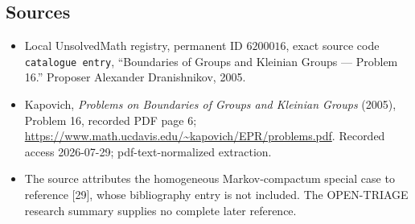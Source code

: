 \documentclass[11pt]{article}
\begin{document}
\subsection{Sources}
\begin{itemize}
\item Local UnsolvedMath registry, permanent ID \(6200016\), exact source code \texttt{catalogue entry}, ``Boundaries of Groups and Kleinian Groups --- Problem 16.'' Proposer Alexander Dranishnikov, 2005.
\item Kapovich, \emph{Problems on Boundaries of Groups and Kleinian Groups} (2005), Problem 16, recorded PDF page 6; \url{https://www.math.ucdavis.edu/~kapovich/EPR/problems.pdf}. Recorded access 2026-07-29; pdf-text-normalized extraction.
\item The source attributes the homogeneous Markov-compactum special case to reference [29], whose bibliography entry is not included. The OPEN-TRIAGE research summary supplies no complete later reference.
\end{itemize}
\end{document}
